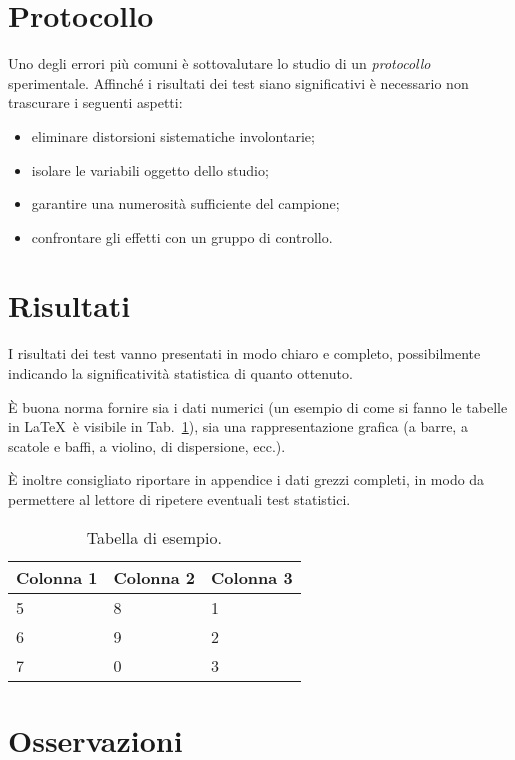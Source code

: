 \documentclass[12pt]{report}
\begin{document}
\section{Protocollo}

Uno degli errori più comuni è sottovalutare lo studio di un \textit{protocollo} sperimentale. Affinché i risultati dei test siano significativi è necessario non trascurare i seguenti aspetti:

\begin{itemize}
    \item eliminare distorsioni sistematiche involontarie;
    \item isolare le variabili oggetto dello studio;
    \item garantire una numerosità sufficiente del campione;
    \item confrontare gli effetti con un gruppo di controllo.
\end{itemize}

\section{Risultati}

I risultati dei test vanno presentati in modo chiaro e completo, possibilmente indicando la significatività statistica di quanto ottenuto.

\`E buona norma fornire sia i dati numerici (un esempio di come si fanno le tabelle in \LaTeX\  è visibile in Tab.\ \ref{tab:sample}), sia una rappresentazione grafica (a barre, a scatole e baffi, a violino, di dispersione, ecc.).

\`E inoltre consigliato riportare in appendice i dati grezzi completi, in modo da permettere al lettore di ripetere eventuali test statistici.

\begin{table}
    \centering
    \begin{tabular}{|l|l|l|}
    \hline
    Colonna 1 & Colonna 2 & Colonna 3 \\ \hline
    5         & 8         & 1         \\
    6         & 9         & 2         \\
    7         & 0         & 3         \\ \hline
\end{tabular}
    \caption{Tabella di esempio.}
    \label{tab:sample}
\end{table}

\section{Osservazioni}
\end{document}
